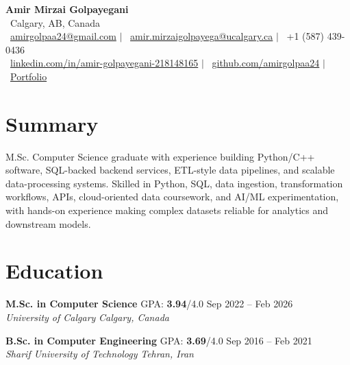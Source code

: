 \documentclass[a4paper,10pt]{article}
\newcommand{\resumeEducationSubheading}[5]{
    \textbf{#1} \hfill #2 \hfill #3 \\
    \textit{#4} \hfill \textit{#5}
}
\begin{document}

\begin{center}
    {\LARGE \textbf{Amir Mirzai Golpayegani}} \\[0.25em]
    \faMapMarker*~Calgary, AB, Canada \\[0.25em]
    \faEnvelope~\href{mailto:amirgolpaa24@gmail.com}{amirgolpaa24@gmail.com}
    $|$
    \faEnvelope~\href{mailto:amir.mirzaigolpayega@ucalgary.ca}{amir.mirzaigolpayega@ucalgary.ca}
    $|$
    \faPhone*~+1 (587) 439-0436 \\[0.25em]
    \faLinkedin~\href{https://linkedin.com/in/amir-golpayegani-218148165}{linkedin.com/in/amir-golpayegani-218148165}
    $|$
    \faGithub~\href{https://github.com/amirgolpaa24}{github.com/amirgolpaa24}
    $|$
    \faGlobe~\href{https://amir-portfolio-navy.vercel.app/}{Portfolio}
\end{center}


\section*{Summary}

M.Sc. Computer Science graduate with experience building Python/C++ software, SQL-backed backend services, ETL-style data pipelines, and scalable data-processing systems. Skilled in Python, SQL, data ingestion, transformation workflows, APIs, cloud-oriented data coursework, and AI/ML experimentation, with hands-on experience making complex datasets reliable for analytics and downstream models.


\section*{Education}

\resumeEducationSubheading
{M.Sc. in Computer Science}
{GPA: \textbf{3.94}/4.0}
{Sep 2022 -- Feb 2026}
{University of Calgary}
{Calgary, Canada}

\vspace{0.35em}

\resumeEducationSubheading
{B.Sc. in Computer Engineering}
{GPA: \textbf{3.69}/4.0}
{Sep 2016 -- Feb 2021}
{Sharif University of Technology}
{Tehran, Iran}

\end{document}
